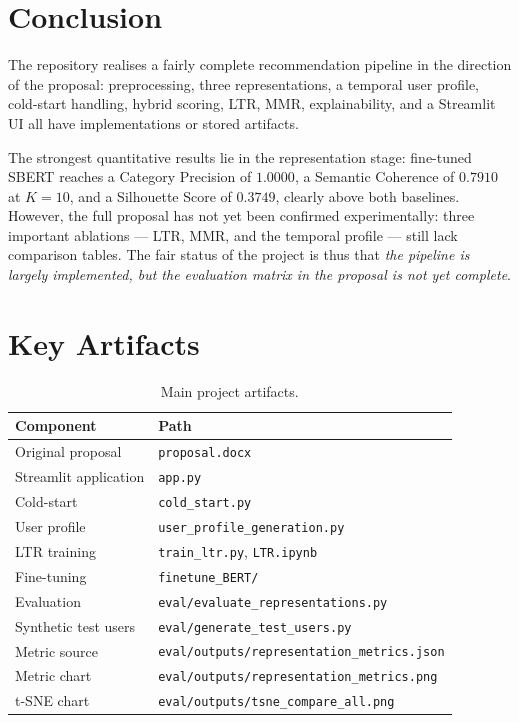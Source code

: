 \documentclass[12pt,a4paper]{article}
\begin{document}
\section{Conclusion}

The repository realises a fairly complete recommendation pipeline in the
direction of the proposal: preprocessing, three representations, a
temporal user profile, cold-start handling, hybrid scoring, LTR, MMR,
explainability, and a Streamlit UI all have implementations or stored
artifacts.

The strongest quantitative results lie in the representation stage:
fine-tuned SBERT reaches a Category Precision of $1.0000$, a Semantic Coherence
of $0.7910$ at $K=10$, and a Silhouette Score of $0.3749$, clearly above both
baselines. However, the full proposal has not yet been confirmed
experimentally: three important ablations --- LTR, MMR, and the temporal
profile --- still lack comparison tables. The fair status of the project is thus
that \emph{the pipeline is largely implemented, but the evaluation matrix in the
proposal is not yet complete}.

\section{Key Artifacts}

\begin{table}[H]
\centering
\caption{Main project artifacts.}\label{tab:artifacts}
\begin{tabular}{ll}
\toprule
\textbf{Component} & \textbf{Path}\\
\midrule
Original proposal & \texttt{proposal.docx}\\
Streamlit application & \texttt{app.py}\\
Cold-start & \texttt{cold\_start.py}\\
User profile & \texttt{user\_profile\_generation.py}\\
LTR training & \texttt{train\_ltr.py}, \texttt{LTR.ipynb}\\
Fine-tuning & \texttt{finetune\_BERT/}\\
Evaluation & \texttt{eval/evaluate\_representations.py}\\
Synthetic test users & \texttt{eval/generate\_test\_users.py}\\
Metric source & \texttt{eval/outputs/representation\_metrics.json}\\
Metric chart & \texttt{eval/outputs/representation\_metrics.png}\\
t-SNE chart & \texttt{eval/outputs/tsne\_compare\_all.png}\\
\bottomrule
\end{tabular}
\end{table}
\end{document}
